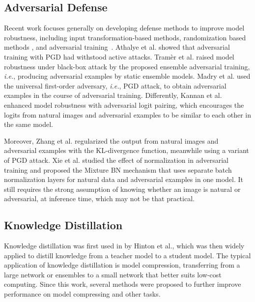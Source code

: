 \documentclass[final]{cvpr}
\begin{document}
\subsection{Adversarial Defense}
Recent work focuses generally on developing defense methods to improve model robustness, including input transformation-based methods, randomization based methods \cite{DBLP:conf/iclr/XieWZRY18,DBLP:conf/iclr/DhillonALBKKA18}, and adversarial training~\cite{zhang2019theoretically,DBLP:journals/corr/abs-1803-06373,DBLP:conf/iclr/MadryMSTV18,DBLP:conf/iclr/TramerKPGBM18}. 
Athalye et al. \cite{pmlr-v80-athalye18a} showed that adversarial training with PGD had withstood active attacks. Tram{\`{e}}r et al. \cite{DBLP:conf/iclr/TramerKPGBM18} raised model robustness under black-box attack by the proposed ensemble adversarial training, \emph{i.e.}, producing adversarial examples by static ensemble models. 
Madry et al. \cite{DBLP:conf/iclr/MadryMSTV18} used the universal first-order adversary, {\it i.e.}, PGD attack, to obtain adversarial examples in the course of adversarial training. 
Differently, Kannan et al. \cite{DBLP:journals/corr/abs-1803-06373} enhanced model robustness with adversarial logit pairing, which encourages the logits from natural images and adversarial examples to be similar to each other in the same model. 

Moreover, Zhang et al. \cite{zhang2019theoretically} regularized the output from natural images and adversarial examples with the KL-divergence function, meanwhile using a variant of PGD attack. 
Xie et al. \cite{xie2019intriguing} studied the effect of normalization in adversarial training and proposed the Mixture BN mechanism that uses separate batch normalization layers for natural data and adversarial examples in one model. It still requires the strong assumption of knowing whether an image is natural or adversarial, at inference time, which may not be that practical. 

\subsection{Knowledge Distillation}
Knowledge distillation was first used in \cite{DBLP:journals/corr/HintonVD15} by Hinton et al., which was then widely applied to distill knowledge from a teacher model to a student model. The typical application of knowledge distillation is model compression, transferring from a large network or ensembles to a small network that better suits low-cost computing. Since this work, several methods \cite{Tung_2019_ICCV,DBLP:conf/cvpr/ParkKLC19,DBLP:journals/corr/SauB16,DBLP:conf/iclr/TarvainenV17,DBLP:journals/corr/abs-1710-07535, tian2019crd} were proposed to further improve performance on model compressing and other tasks. 
\end{document}
